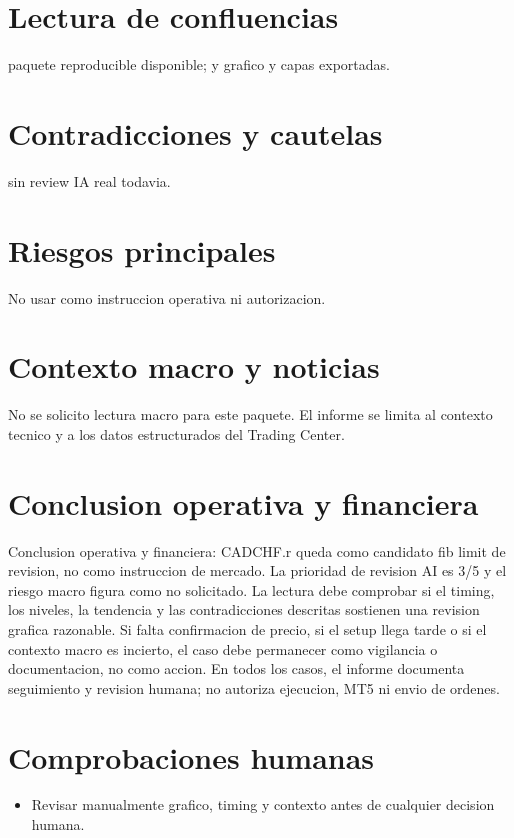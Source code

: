 \documentclass[11pt,a4paper]{article}
\begin{document}
\section*{Lectura de confluencias}
paquete reproducible disponible; y grafico y capas exportadas.

\section*{Contradicciones y cautelas}
sin review IA real todavia.

\section*{Riesgos principales}
No usar como instruccion operativa ni autorizacion.

\section*{Contexto macro y noticias}
No se solicito lectura macro para este paquete. El informe se limita al contexto tecnico y a los datos estructurados del Trading Center.

\section*{Conclusion operativa y financiera}
Conclusion operativa y financiera: CADCHF.r queda como candidato fib limit de revision, no como instruccion de mercado. La prioridad de revision AI es 3/5 y el riesgo macro figura como no solicitado. La lectura debe comprobar si el timing, los niveles, la tendencia y las contradicciones descritas sostienen una revision grafica razonable. Si falta confirmacion de precio, si el setup llega tarde o si el contexto macro es incierto, el caso debe permanecer como vigilancia o documentacion, no como accion. En todos los casos, el informe documenta seguimiento y revision humana; no autoriza ejecucion, MT5 ni envio de ordenes.

\section*{Comprobaciones humanas}
\begin{itemize}
  \item Revisar manualmente grafico, timing y contexto antes de cualquier decision humana.
\end{itemize}
\end{document}
